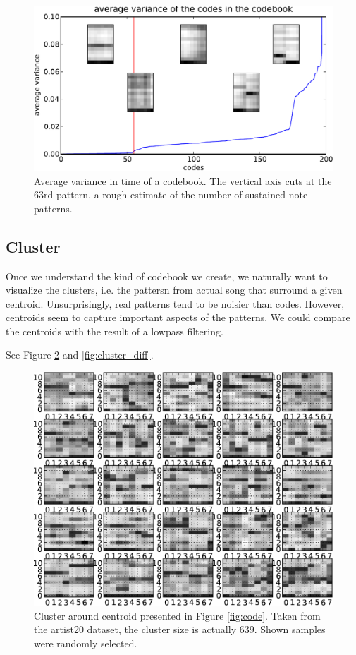 \documentclass{article}
\begin{document}
\begin{figure}[htb]
\begin{center}
\includegraphics[width=.9\columnwidth]{code_variance}
\end{center}
\caption{\small{Average variance in time of a codebook. The vertical
axis cuts at the $63$rd pattern, a rough estimate of the number of 
sustained note patterns.
}}
\label{fig:code_var}
\end{figure}

\subsection{Cluster}
Once we understand the kind of codebook we create, we naturally want
to visualize the clusters, i.e. the pattersn from actual song that
surround a given centroid. Unsurprisingly, real patterns tend to be
noisier than codes. However, centroids seem to capture important aspects
of the patterns. We could compare the centroids with the result of
a lowpass filtering.

See Figure \ref{fig:cluster} and \ref{fig:cluster_diff}.

\begin{figure}[htb]
\begin{center}
\includegraphics[width=.9\columnwidth]{close_patterns1}
\end{center}
\caption{\small{Cluster around centroid presented in
Figure \ref{fig:code}. Taken from the artist20 dataset, the cluster
size is actually $639$. Shown samples were randomly selected.
}}
\label{fig:cluster}
\end{figure}
\end{document}
